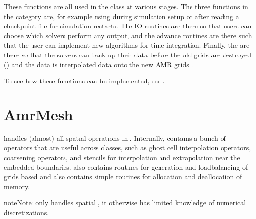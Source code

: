\documentclass[letterpaper,10pt,english]{sphinxmanual}
\begin{document}
\sphinxAtStartPar
These functions are all used in the  class at various stages.
The three functions in the category  are, for example using during simulation setup or after reading a checkpoint file for simulation restarts.
The IO routines are there so that users can choose which solvers perform any output, and the advance routines are there such that the user can implement new algorithms for time integration.
Finally, the  are there so that the solvers can back up their data before the old grids are destroyed () and the data is interpolated data onto the new AMR grids .

\sphinxAtStartPar
To see how these functions can be implemented, see {\hyperref[\detokenize{Tutorials/Tutorial:chap-tutorial}]{}}.

\sphinxstepscope


\section{AmrMesh}
\label{\detokenize{Source/AmrMesh:amrmesh}}\label{\detokenize{Source/AmrMesh:chap-amrmesh}}\label{\detokenize{Source/AmrMesh::doc}}
\sphinxAtStartPar
{\hyperref[\detokenize{Source/AmrMesh:chap-amrmesh}]{}} handles (almost) all spatial operations in .
Internally, {\hyperref[\detokenize{Source/AmrMesh:chap-amrmesh}]{}} contains a bunch of operators that are useful across classes, such as ghost cell interpolation operators, coarsening operators, and stencils for interpolation and extrapolation near the embedded boundaries. {\hyperref[\detokenize{Source/AmrMesh:chap-amrmesh}]{}} also contains routines for generation and load\sphinxhyphen{}balancing of grids based and also contains simple routines for allocation and deallocation of memory.

\begin{sphinxadmonition}{note}{Note:}
\sphinxAtStartPar
{\hyperref[\detokenize{Source/AmrMesh:chap-amrmesh}]{}} only handles spatial , it otherwise has limited knowledge of numerical discretizations.
\end{sphinxadmonition}
\end{document}

